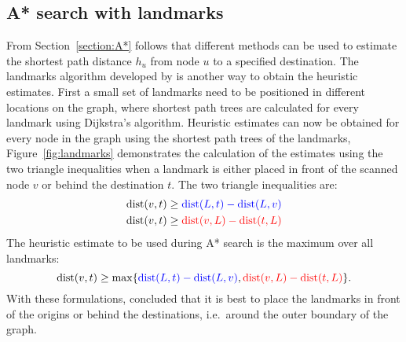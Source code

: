 \subsection{A* search with landmarks}
From Section~\ref{section:A*} follows that
different methods can be used to estimate the shortest path distance $h_u$ from node $u$ to a specified destination.
The landmarks algorithm developed by \citet{GoldbergLandmarks} is another way to obtain the heuristic estimates.
First a small set of landmarks need to be positioned in different locations on the graph,
where shortest path trees are calculated for every landmark using Dijkstra's algorithm.
Heuristic estimates can now be obtained for every node in the graph using the shortest path trees of the landmarks,
Figure~\ref{fig:landmarks} demonstrates the calculation of the estimates using the two triangle inequalities when a landmark is either placed in front of the scanned node $v$ or behind the destination $t$.
The two triangle inequalities are:
\begin{align}
     \text{dist}(v, t) & \geq \textcolor{blue}{\text{dist}(L,t)-\text{dist}(L,v)} \\
     \text{dist}(v, t) & \geq \textcolor{red}{\text{dist}(v,L)-\text{dist}(t,L)}  
\end{align}
The heuristic estimate to be used during A* search is the maximum over all landmarks:
\begin{equation}
  \text{dist}(v,t) \geq \max\{ \textcolor{blue}{\text{dist}(L,t)-\text{dist}(L,v)}, \textcolor{red}{\text{dist}(v,L)-\text{dist}(t,L)} \}.
\end{equation}
With these formulations, \citet{GoldbergLandmarks} concluded that it is best to place the landmarks in front of the origins or behind the destinations,
i.e.\ around the outer boundary of the graph.


